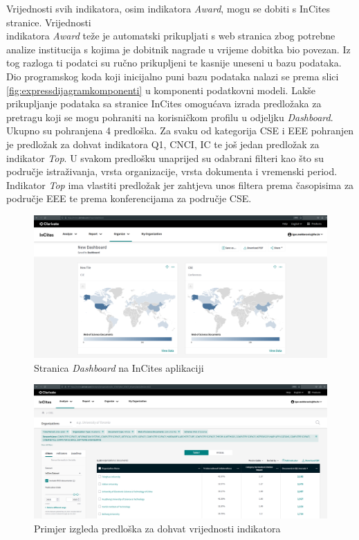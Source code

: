 \documentclass[times, utf8, zavrsni]{fer}
\begin{document}
Vrijednosti svih indikatora, osim indikatora \emph{Award}, mogu se dobiti s InCites stranice. Vrijednosti \\indikatora \emph{Award} teže je automatski prikupljati 
s web stranica zbog potrebne analize institucija s kojima je dobitnik nagrade u vrijeme dobitka bio povezan. Iz tog razloga ti podatci 
su ručno prikupljeni te kasnije uneseni u bazu podataka. 
\\Dio programskog koda koji inicijalno puni bazu podataka nalazi se prema slici \ref{fig:expressdijagramkomponenti} u komponenti podatkovni modeli. Lakše prikupljanje podataka sa stranice InCites omogućava izrada predložaka za pretragu koji se mogu pohraniti 
na korisničkom profilu u odjeljku \emph{Dashboard}. Ukupno su pohranjena 4 predloška. Za svaku od kategorija CSE i EEE pohranjen je predložak 
za dohvat indikatora Q1, CNCI, IC te još jedan predložak za indikator \emph{Top}. U svakom predlošku unaprijed su odabrani filteri kao što su područje istraživanja,
vrsta organizacije, vrsta dokumenta i vremenski period. Indikator \emph{Top} ima vlastiti predložak jer zahtjeva unos filtera prema časopisima za područje EEE te 
prema konferencijama za područje CSE. 
\begin{figure}[htb]
    \hspace*{-2cm} 
       \includegraphics[scale=0.21]{dashboard.png} 
       \caption{Stranica \emph{Dashboard} na InCites aplikaciji}
       \label{fig:dashboard}
       \end{figure} 
\begin{figure}[htb]
        \hspace*{-2cm} 
           \includegraphics[scale=0.21]{predlozak.png} 
           \caption{Primjer izgleda predloška za dohvat vrijednosti indikatora}
           \label{fig:predlozak}
           \end{figure}  
\end{document}

